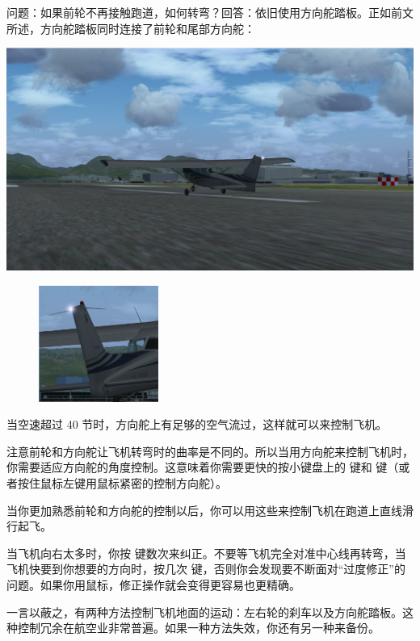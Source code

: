 问题：如果前轮不再接触跑道，如何转弯？回答：依旧使用方向舵踏板。正如前文所述，方向舵踏板同时连接了前轮和尾部方向舵：

\begin{center}
  \includegraphics[width=\textwidth]{img/basic_tutorial/rotation}
\end{center}

\begin{figure}
  \includegraphics[width=0.35\textwidth]{img/basic_tutorial/rudder}
\end{figure}

当空速超过 40 节时，方向舵上有足够的空气流过，这样就可以来控制飞机。

注意前轮和方向舵让飞机转弯时的曲率是不同的。所以当用方向舵来控制飞机时，你需要适应方向舵的角度控制。这意味着你需要更快的按小键盘上的  键和  键（或者按住鼠标左键用鼠标紧密的控制方向舵）。

当你更加熟悉前轮和方向舵的控制以后，你可以用这些来控制飞机在跑道上直线滑行起飞。

当飞机向右太多时，你按  键数次来纠正。不要等飞机完全对准中心线再转弯，当飞机快要到你想要的方向时，按几次  键，否则你会发现要不断面对“过度修正”的问题。如果你用鼠标，修正操作就会变得更容易也更精确。

一言以蔽之，有两种方法控制飞机地面的运动：左右轮的刹车以及方向舵踏板。这种控制冗余在航空业非常普遍。如果一种方法失效，你还有另一种来备份。

